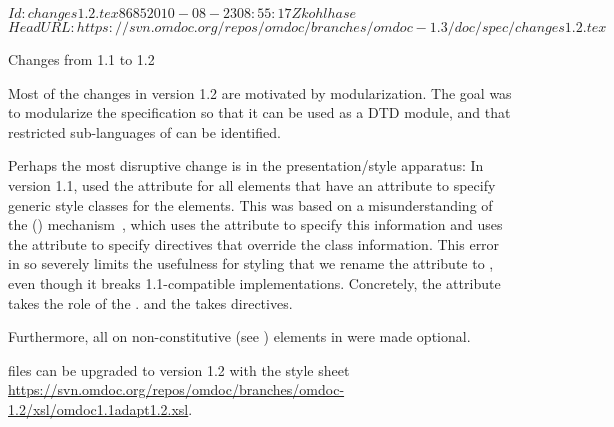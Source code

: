 \svnInfo $Id: changes1.2.tex 8685 2010-08-23 08:55:17Z kohlhase $
\svnKeyword $HeadURL: https://svn.omdoc.org/repos/omdoc/branches/omdoc-1.3/doc/spec/changes1.2.tex $

\begin{tsection}[id=changes1.2]{Changes from 1.1 to 1.2}

  Most of the changes in version 1.2 are motivated by modularization. The goal was
  to modularize the specification so that it can be used as a DTD module, and that
  restricted sub-languages of {\omdoc} can be identified. 
  
  Perhaps the most disruptive change is in the presentation/style apparatus: In version
  1.1, {\omdoc} used the {} attribute for all elements that have an
  {} attribute to specify generic style classes for the {\omdoc}
  elements.  This was based on a misunderstanding of the {\xml} {} ({\css}) mechanism~\cite{BosHak:css98}, which uses the
  {} attribute to specify this information and uses the
  {} attribute to specify {\css} directives
  that override the class information.  This error in {} so severely limits
  the usefulness for styling that we rename the {}
  {} attribute to
  {}, even though it breaks 1.1-compatible
  implementations. Concretely, the {} {} attribute takes
  the role of the {} {}. and the {} {}\label{style/class-comment} takes {\css} directives.

  Furthermore, all {} on non-constitutive (see
  {}) elements in {\omdoc} were made optional.
  
  {} files can be upgraded to version 1.2 with the {\xslt} style sheet
    \url{https://svn.omdoc.org/repos/omdoc/branches/omdoc-1.2/xsl/omdoc1.1adapt1.2.xsl}.


\end{tsection}
